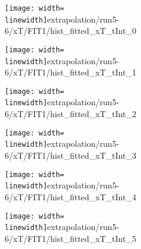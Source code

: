 \begin{figure}
\begin{subfigure}{0.45\linewidth}
\texttt{[image: width=\\linewidth]}{extrapolation/run5-6/xT/FIT1/hist_fitted_xT_tInt_0}
\end{subfigure}
\begin{subfigure}{0.45\linewidth}
\texttt{[image: width=\\linewidth]}{extrapolation/run5-6/xT/FIT1/hist_fitted_xT_tInt_1}
\end{subfigure}
\begin{subfigure}{0.45\linewidth}
\texttt{[image: width=\\linewidth]}{extrapolation/run5-6/xT/FIT1/hist_fitted_xT_tInt_2}
\end{subfigure}
\begin{subfigure}{0.45\linewidth}
\texttt{[image: width=\\linewidth]}{extrapolation/run5-6/xT/FIT1/hist_fitted_xT_tInt_3}
\end{subfigure}
\begin{subfigure}{0.45\linewidth}
\texttt{[image: width=\\linewidth]}{extrapolation/run5-6/xT/FIT1/hist_fitted_xT_tInt_4}
\end{subfigure}
\begin{subfigure}{0.45\linewidth}
\texttt{[image: width=\\linewidth]}{extrapolation/run5-6/xT/FIT1/hist_fitted_xT_tInt_5}
\end{subfigure}
\end{figure}
